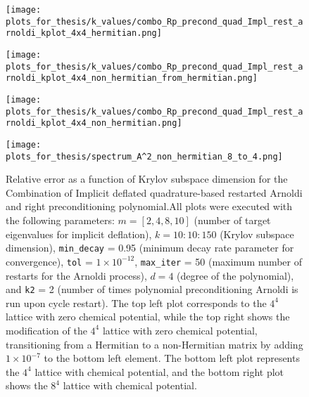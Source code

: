 \begin{figure}[H]
    \centering
    \begin{minipage}{0.45\textwidth}
        \centering
        \texttt{[image: plots\_for\_thesis/k\_values/combo\_Rp\_precond\_quad\_Impl\_rest\_arnoldi\_kplot\_4x4\_hermitian.png]} %
    \end{minipage}%
    \hspace{0.02\textwidth} %
    \begin{minipage}{0.45\textwidth}
        \centering
        \texttt{[image: plots\_for\_thesis/k\_values/combo\_Rp\_precond\_quad\_Impl\_rest\_arnoldi\_kplot\_4x4\_non\_hermitian\_from\_hermitian.png]} %
    \end{minipage}
    
    \vspace{0.02\textwidth} %
    
    \begin{minipage}{0.45\textwidth}
        \centering
        \texttt{[image: plots\_for\_thesis/k\_values/combo\_Rp\_precond\_quad\_Impl\_rest\_arnoldi\_kplot\_4x4\_non\_hermitian.png]} %
    \end{minipage}%
    \hspace{0.02\textwidth} %
    \begin{minipage}{0.45\textwidth}
        \centering
        \texttt{[image: plots\_for\_thesis/spectrum\_A^2\_non\_hermitian\_8\_to\_4.png]} %
    \end{minipage}
    
    \caption{\small Relative error as a function of Krylov subspace dimension for the Combination of Implicit deflated quadrature-based restarted Arnoldi and right preconditioning polynomial.All plots were executed with the following parameters: $m = [2, 4, 8, 10]$ (number of target eigenvalues for implicit deflation), $k = 10:10:150$ (Krylov subspace dimension), \texttt{min\_decay} = 0.95 (minimum decay rate parameter for convergence), \texttt{tol} = $1 \times 10^{-12}$, \texttt{max\_iter} = 50 (maximum number of restarts for the Arnoldi process), $d = 4$ (degree of the polynomial), and \texttt{k2} = 2 (number of times polynomial preconditioning Arnoldi is run upon cycle restart). The top left plot corresponds to the $4^4$ lattice with zero chemical potential, while the top right shows the modification of the $4^4$ lattice with zero chemical potential, transitioning from a Hermitian to a non-Hermitian matrix by adding $1 \times 10^{-7}$ to the bottom left element. The bottom left plot represents the $4^4$ lattice with chemical potential, and the bottom right plot shows the $8^4$ lattice with chemical potential.}
    \label{fig:combo_imp_rest_arnoldi+right_precond_k_plot}
\end{figure}

